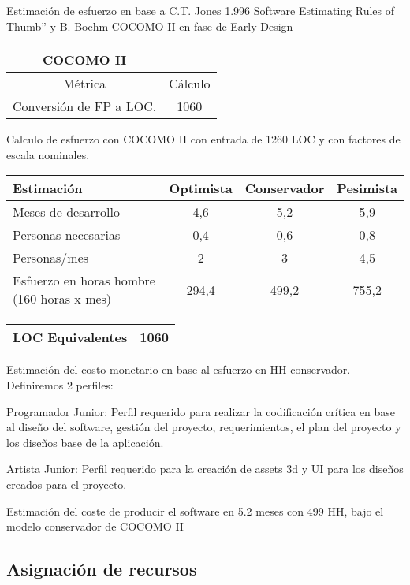 Estimación de esfuerzo en base a C.T. Jones 1.996 Software Estimating Rules of Thumb” y B. Boehm COCOMO II en fase de Early Design

\begin{tabular}{|c|c|}
\hline 
COCOMO II &   \\ 
\hline 
Métrica  & Cálculo \\ 
\hline 
Conversión de FP a LOC. & 1060 \\ 
\hline 
\end{tabular}

Calculo de esfuerzo con COCOMO II con entrada de 1260 LOC y con factores de escala nominales.

\begin{tabular}{|p{3cm}|c|c|c|}
 \hline 
 Estimación & Optimista & Conservador & Pesimista \\ 
 \hline 
 Meses de desarrollo & 4,6 & 5,2 & 5,9 \\ 
 \hline 
 Personas necesarias & 0,4 & 0,6 & 0,8 \\ 
 \hline 
 Personas/mes & 2 & 3 & 4,5 \\ 
 \hline 
 Esfuerzo en horas hombre (160 horas x mes) & 294,4 & 499,2 & 755,2 \\ 
 \hline 
 \end{tabular}
 
\begin{tabular}{|c|c|}
  \hline 
  LOC Equivalentes & 1060 \\ 
  \hline 
\end{tabular}

Estimación del costo monetario en base al esfuerzo en HH conservador. Definiremos 2 perfiles:

Programador Junior: Perfil requerido para realizar la codificación crítica en base al diseño del software, gestión del proyecto, requerimientos, el plan del proyecto y los diseños base de la aplicación.

Artista Junior: Perfil requerido para la creación de assets 3d y UI para los diseños creados para el proyecto.

Estimación del coste de producir el software en 5.2 meses con 499 HH, bajo el modelo conservador de COCOMO II 

\subsection{Asignación de recursos}

